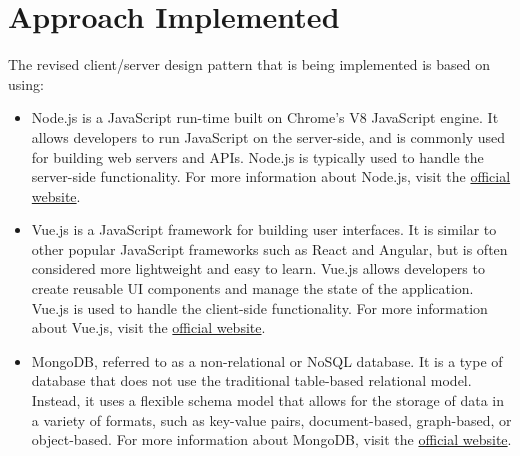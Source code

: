 \section{Approach Implemented}
The revised client/server design pattern that is being implemented is based on using:
\begin{itemize}
\item Node.js is a JavaScript run-time built on Chrome's V8 JavaScript engine. It allows developers to run JavaScript on the server-side, and is commonly used for building web servers and APIs. Node.js is typically used to handle the server-side functionality.
For more information about Node.js, visit the \href{https://nodejs.org/}{official website}.
\item Vue.js is a JavaScript framework for building user interfaces. It is similar to other popular JavaScript frameworks such as React and Angular, but is often considered more lightweight and easy to learn. Vue.js allows developers to create reusable \ac{UI} components and manage the state of the application. Vue.js is used to handle the client-side functionality.
For more information about Vue.js, visit the \href{https://vuejs.org/}{official website}.
\item MongoDB, referred to as a non-relational or NoSQL database. It is a type of database that does not use the traditional table-based relational model. Instead, it uses a flexible schema model that allows for the storage of data in a variety of formats, such as key-value pairs, document-based, graph-based, or object-based.
For more information about MongoDB, visit the \href{https://www.mongodb.com/}{official website}.
\end{itemize}

